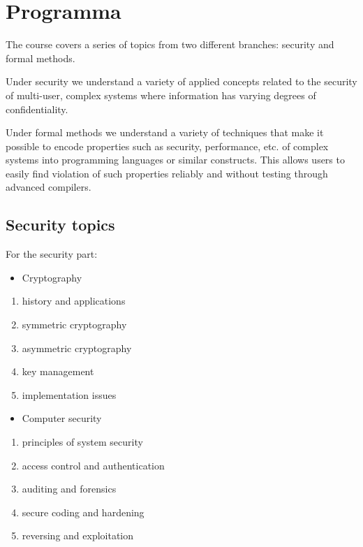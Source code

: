 \section{Programma}
	The course covers a series of topics from two different branches: security and formal methods. 

	Under security we understand a variety of applied concepts related to the security of multi-user, complex systems where information has varying degrees of confidentiality.
	
	Under formal methods we understand a variety of techniques that make it possible to encode properties such as security, performance, etc. of complex systems into programming languages or similar constructs. This allows users to easily find violation of such properties reliably and without testing through advanced compilers.
	
	\subsection*{Security topics}

	For the security part:
	\begin{itemize}
	\itemsep1pt\parskip0pt
	\item
	  Cryptography
	\end{itemize}

	\begin{enumerate}
	\def\labelenumi{\arabic{enumi}.}
	\itemsep1pt\parskip0pt
	\item
	  history and applications
	\item
	  symmetric cryptography
	\item
	  asymmetric cryptography
	\item
	  key management
	\item
	  implementation issues
	\end{enumerate}

	\begin{itemize}
	\itemsep1pt\parskip0pt
	\item
	  Computer security
	\end{itemize}

	\begin{enumerate}
	\def\labelenumi{\arabic{enumi}.}
	\itemsep1pt\parskip0pt
	\item
	  principles of system security
	\item
	  access control and authentication
	\item
	  auditing and forensics
	\item
	  secure coding and hardening
	\item
	  reversing and exploitation
	\end{enumerate}

